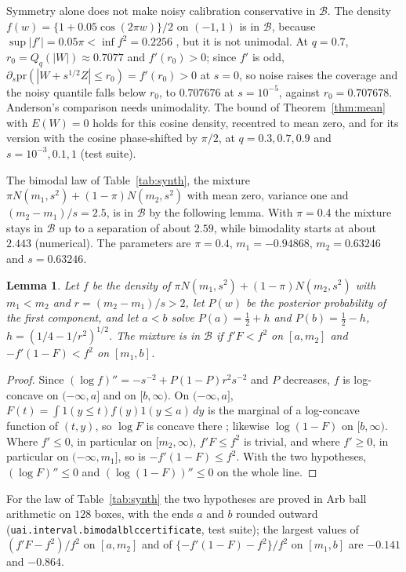 \documentclass[11pt]{article}
\renewcommand{\_}{\usc\allowbreak}
\newtheorem{lemma}{Lemma}
\newcommand{\pr}{\mathrm{pr}}
\begin{document}
Symmetry alone does not make noisy calibration conservative in $\mathcal B$. The density $f(w) = \{1 + 0.05\cos(2\pi w)\}/2$ on $(-1, 1)$ is in $\mathcal B$, because $\sup|f'| = 0.05\pi < \inf f^2 = 0.2256$ \citep[][Theorem~1]{dumbgen2017}, but it is not unimodal. At $q = 0.7$, $r_0 = Q_q(|W|) \approx 0.7077$ and $f'(r_0) > 0$; since $f'$ is odd, $\partial_s \pr(|W + s^{1/2}Z| \le r_0) = f'(r_0) > 0$ at $s = 0$, so noise raises the coverage and the noisy quantile falls below $r_0$, to $0.707676$ at $s = 10^{-5}$, against $r_0 = 0.707678$. Anderson's comparison needs unimodality. The bound of Theorem~\ref{thm:mean} with $E(W) = 0$ holds for this cosine density, recentred to mean zero, and for its version with the cosine phase-shifted by $\pi/2$, at $q = 0.3, 0.7, 0.9$ and $s = 10^{-3}, 0.1, 1$ (test suite).

The bimodal law of Table~\ref{tab:synth}, the mixture $\pi N(m_1, s^2) + (1-\pi)N(m_2, s^2)$ with mean zero, variance one and $(m_2 - m_1)/s = 2.5$, is in $\mathcal B$ by the following lemma. With $\pi = 0.4$ the mixture stays in $\mathcal B$ up to a separation of about $2.59$, while bimodality starts at about $2.443$ (numerical). The parameters are $\pi = 0.4$, $m_1 = -0.94868$, $m_2 = 0.63246$ and $s = 0.63246$.

\begin{lemma}\label{lem:bimodal}
Let $f$ be the density of $\pi N(m_1, s^2) + (1-\pi)N(m_2, s^2)$ with $m_1 < m_2$ and $r = (m_2 - m_1)/s > 2$, let $P(w)$ be the posterior probability of the first component, and let $a < b$ solve $P(a) = \tfrac12 + h$ and $P(b) = \tfrac12 - h$, $h = (1/4 - 1/r^2)^{1/2}$. The mixture is in $\mathcal B$ if $f'F < f^2$ on $[a, m_2]$ and $-f'(1-F) < f^2$ on $[m_1, b]$.
\end{lemma}

\begin{proof}
Since $(\log f)'' = -s^{-2} + P(1-P)r^2s^{-2}$ and $P$ decreases, $f$ is log-concave on $(-\infty, a]$ and on $[b, \infty)$. On $(-\infty, a]$, $F(t) = \int 1(y \le t)f(y)1(y \le a)\,dy$ is the marginal of a log-concave function of $(t, y)$, so $\log F$ is concave there \citep{prekopa1973}; likewise $\log(1-F)$ on $[b, \infty)$. Where $f' \le 0$, in particular on $[m_2, \infty)$, $f'F \le f^2$ is trivial, and where $f' \ge 0$, in particular on $(-\infty, m_1]$, so is $-f'(1-F) \le f^2$. With the two hypotheses, $(\log F)'' \le 0$ and $(\log(1-F))'' \le 0$ on the whole line.
\end{proof}

For the law of Table~\ref{tab:synth} the two hypotheses are proved in Arb ball arithmetic on $128$ boxes, with the ends $a$ and $b$ rounded outward (\texttt{uai.interval.bimodal\_blc\_certificate}, test suite); the largest values of $(f'F - f^2)/f^2$ on $[a, m_2]$ and of $\{-f'(1-F) - f^2\}/f^2$ on $[m_1, b]$ are $-0.141$ and $-0.864$.
\end{document}
